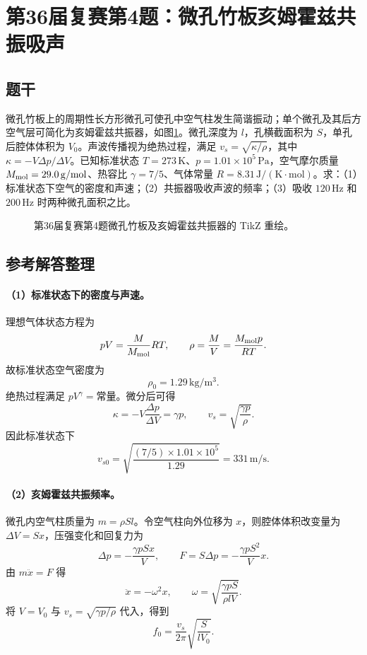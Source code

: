 \section{第36届复赛第4题：微孔竹板亥姆霍兹共振吸声}
\subsection{题干}
微孔竹板上的周期性长方形微孔可使孔中空气柱发生简谐振动；单个微孔及其后方空气层可简化为亥姆霍兹共振器，如图\ref{fig:cpho36q04}。微孔深度为 $l$，孔横截面积为 $S$，单孔后腔体体积为 $V_0$。声波传播视为绝热过程，满足 $v_s=\sqrt{\kappa/\rho}$，其中 $\kappa=-V\Delta p/\Delta V$。已知标准状态 $T=273\,\mathrm{K}$、$p=1.01\times10^5\,\mathrm{Pa}$，空气摩尔质量 $M_{\rm mol}=29.0\,\mathrm{g/mol}$、热容比 $\gamma=7/5$、气体常量 $R=8.31\,\mathrm{J/(K\cdot mol)}$。求：（1）标准状态下空气的密度和声速；（2）共振器吸收声波的频率；（3）吸收 $120\,\mathrm{Hz}$ 和 $200\,\mathrm{Hz}$ 时两种微孔面积之比。
\begin{figure}[htbp]\centering

\caption{第36届复赛第4题微孔竹板及亥姆霍兹共振器的 TikZ 重绘。}\label{fig:cpho36q04}
\end{figure}

\subsection{参考解答整理}
\paragraph{（1）标准状态下的密度与声速。} 理想气体状态方程为
\[
pV=\frac{M}{M_{\rm mol}}RT,
\qquad
\rho=\frac{M}{V}=\frac{M_{\rm mol}p}{RT}.
\]
故标准状态空气密度为
\[
\boxed{\rho_0=1.29\,\mathrm{kg/m^3}.}
\]
绝热过程满足 $pV^\gamma=\text{常量}$。微分后可得
\[
\kappa=-V\frac{\Delta p}{\Delta V}=\gamma p,
\qquad
v_s=\sqrt{\frac{\gamma p}{\rho}}.
\]
因此标准状态下
\[
\boxed{v_{s0}=\sqrt{\frac{(7/5)\times1.01\times10^5}{1.29}}=331\,\mathrm{m/s}.}
\]

\paragraph{（2）亥姆霍兹共振频率。} 微孔内空气柱质量为 $m=\rho Sl$。令空气柱向外位移为 $x$，则腔体体积改变量为 $\Delta V=Sx$，压强变化和回复力为
\[
\Delta p=-\frac{\gamma pSx}{V},
\qquad
F=S\Delta p=-\frac{\gamma pS^2}{V}x.
\]
由 $m\ddot{x}=F$ 得
\[
\ddot{x}=-\omega^2x,
\qquad
\omega=\sqrt{\frac{\gamma pS}{\rho lV}}.
\]
将 $V=V_0$ 与 $v_s=\sqrt{\gamma p/\rho}$ 代入，得到
\[
\boxed{f_0=\frac{v_s}{2\pi}\sqrt{\frac{S}{lV_0}}.}
\]

